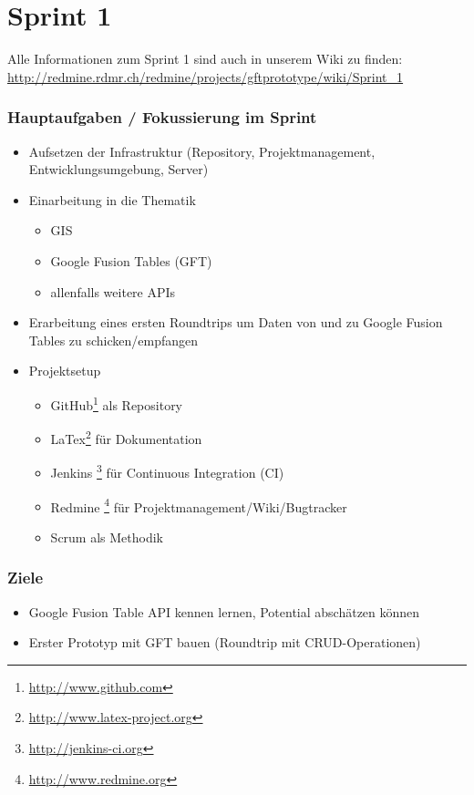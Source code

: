 \section{Sprint 1}


Alle Informationen zum Sprint 1 sind auch in unserem Wiki zu finden:
\url{http://redmine.rdmr.ch/redmine/projects/gftprototype/wiki/Sprint_1}

\subsubsection{Hauptaufgaben / Fokussierung im Sprint}

\begin{itemize}
	\item Aufsetzen der Infrastruktur (Repository, Projektmanagement, Entwicklungsumgebung, Server)
	\item Einarbeitung in die Thematik
	\begin{itemize}
		\item GIS
		\item Google Fusion Tables (GFT)
		\item allenfalls weitere \gls{API}s
	\end{itemize}
	\item Erarbeitung eines ersten Roundtrips um Daten von und zu Google Fusion Tables zu schicken/empfangen
	\item Projektsetup
	\begin{itemize}
		\item GitHub\footnote{\url{http://www.github.com}} als Repository
		\item LaTex\footnote{\url{http://www.latex-project.org}} für Dokumentation
		\item Jenkins \footnote{\url{http://jenkins-ci.org}} für Continuous Integration (CI)
		\item Redmine \footnote{\url{http://www.redmine.org}} für Projektmanagement/Wiki/Bugtracker
		\item Scrum als Methodik
	\end{itemize}
\end{itemize}

\subsubsection{Ziele}
\begin{itemize}
	\item Google Fusion Table \gls{API} kennen lernen, Potential abschätzen können
	\item Erster Prototyp mit GFT bauen (Roundtrip mit \gls{CRUD}-Operationen)
\end{itemize}

